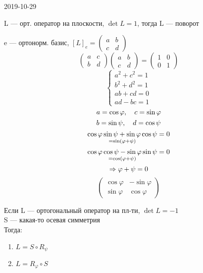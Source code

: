 \documentclass[main]{subfiles}
\begin{document}
  \begin{lect}{2019-10-29}
    \begin{definition}
      L --- орт. оператор на плоскости, $\det L = 1$, тогда L --- поворот
    \end{definition}

    e --- ортонорм. базис, $[L]_e = \begin{pmatrix}
      a & b\\
      c & d
    \end{pmatrix}$
    \[\begin{pmatrix}
      a & c\\
      b & d
    \end{pmatrix} \begin{pmatrix}
      a & b\\
      c & d
    \end{pmatrix} = \begin{pmatrix}
      1 & 0\\
      0 & 1
    \end{pmatrix}\]
    \[\begin{cases}
      a^2 + c^2 = 1\\
      b^2 + d^2 = 1\\
      ab + cd = 0\\
      ad - bc = 1
    \end{cases}\]
    \[a = \cos \varphi,\quad c = \sin \varphi\]
    \[b = \sin \psi,\quad d = \cos \psi\]
    \[\underset{= \sin(\varphi + \psi)}{\cos \varphi \sin \psi + \sin \varphi \cos \psi} = 0\]
    \[\underset{= \cos(\varphi + \psi)}{\cos \varphi \cos \psi - \sin \varphi \sin \psi} = 0\]
    \[\Rightarrow \varphi + \psi = 0\]
    \[\begin{pmatrix}
      \cos \varphi & - \sin \varphi\\
      \sin \varphi & \cos \varphi
    \end{pmatrix}\]

    \begin{definition}
      Если L --- ортогональный оператор на пл-ти, $\det L = -1$\\
      S --- какая-то осевая симметрия\\
      Тогда:
      \begin{enumerate}
        \item $L = S \circ R_{\psi}$
        \item $L = R_{\varphi} \circ S$
      \end{enumerate}
    \end{definition}


\end{lect}
\end{document}
